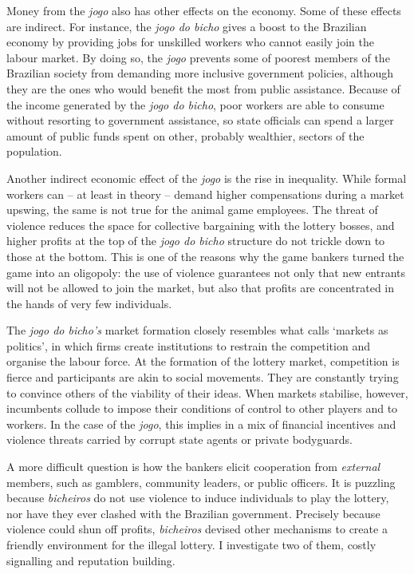 \documentclass[a4paper,12pt]{article}
\begin{document}
Money from the \textit{jogo} also has other effects on the economy. Some of these effects are indirect. For instance, the \textit{jogo do bicho} gives a boost to the Brazilian economy by providing jobs for unskilled workers who cannot easily join the labour market. By doing so, the \textit{jogo} prevents some of poorest members of the Brazilian society from demanding more inclusive government policies, although they are the ones who would benefit the most from public assistance. Because of the income generated by the \textit{jogo do bicho}, poor workers are able to consume without resorting to government assistance, so state officials can spend a larger amount of public funds spent on other, probably wealthier, sectors of the population.

Another indirect economic effect of the \textit{jogo} is the rise in inequality. While formal workers can -- at least in theory -- demand higher compensations during a market upswing, the same is not true for the animal game employees. The threat of violence reduces the space for collective bargaining with the lottery bosses, and higher profits at the top of the \textit{jogo do bicho} structure do not trickle down to those at the bottom. This is one of the reasons why the game bankers turned the game into an oligopoly: the use of violence guarantees not only that new entrants will not be allowed to join the market, but also that profits are concentrated in the hands of very few individuals.  

The \textit{jogo do bicho's} market formation closely resembles what \citet{fligstein1996markets} calls `markets as politics', in which firms create institutions to restrain the competition and organise the labour force. At the formation of the lottery market, competition is fierce and participants are akin to social movements. They are constantly trying to convince others of the viability of their ideas. When markets stabilise, however, incumbents collude to impose their conditions of control to other players and to workers. In the case of the \textit{jogo}, this implies in a mix of financial incentives and violence threats carried by corrupt state agents or private bodyguards. 

A more difficult question is how the bankers elicit cooperation from \textit{external} members, such as gamblers, community leaders, or public officers. It is puzzling because \textit{bicheiros} do not use violence to induce individuals to play the lottery, nor have they ever clashed with the Brazilian government. Precisely because violence could shun off profits, \textit{bicheiros} devised other mechanisms to create a friendly environment for the illegal lottery. I investigate two of them, costly signalling and reputation building. 
\end{document}
